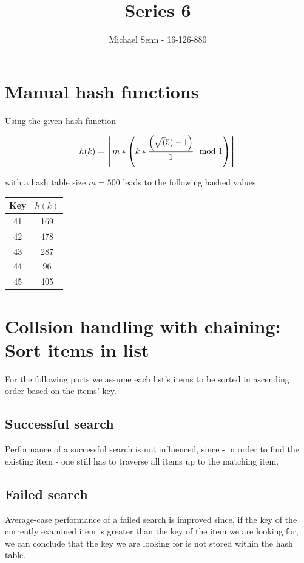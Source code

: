\documentclass[a4paper]{scrartcl}
\title{Series 6}
\author{Michael Senn - 16-126-880}
\date{}
\DeclarePairedDelimiter\floor{\lfloor}{\rfloor}
\begin{document}
\maketitle

\section{Manual hash functions}

Using the given hash function

\[
	h(k) = \floor*{m * \left( k * \frac{\left( \sqrt(5) - 1 \right)}{1} \mod 1 \right)}
\]

with a hash table size $m = 500$ leads to the following hashed values.
\\

\begin{tabular}{|c|c|}
	\hline
	Key & $h(k)$ \\
	\hline
	41 & 169 \\
	42 & 478 \\
	43 & 287 \\
	44 & 96 \\
	45 & 405 \\
	\hline
\end{tabular}

\section{Collsion handling with chaining: Sort items in list}

For the following parts we assume each list's items to be sorted in ascending
order based on the items' key.

\subsection{Successful search}

Performance of a successful search is not influenced, since - in order to find
the existing item - one still has to traverse all items up to the matching
item.

\subsection{Failed search}

Average-case performance of a failed search is improved since, if the key of
the currently examined item is greater than the key of the item we are looking
for, we can conclude that the key we are looking for is not stored within the
hash table.
\end{document}
